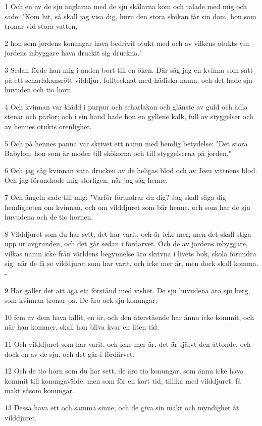 \par 1 Och en av de sju änglarna med de sju skålarna kom och talade med mig och sade: "Kom hit, så skall jag visa dig, huru den stora skökan får sin dom, hon som tronar vid stora vatten,
\par 2 hon som jordens konungar hava bedrivit otukt med och av vilkens otukts vin jordens inbyggare hava druckit sig druckna."
\par 3 Sedan förde han mig i anden bort till en öken. Där såg jag en kvinna som satt på ett scharlakansrött vilddjur, fulltecknat med hädiska namn; och det hade sju huvuden och tio horn.
\par 4 Och kvinnan var klädd i purpur och scharlakan och glänste av guld och ädla stenar och pärlor; och i sin hand hade hon en gyllene kalk, full av styggelser och av hennes otukts orenlighet.
\par 5 Och på hennes panna var skrivet ett namn med hemlig betydelse: "Det stora Babylon, hon som är moder till skökorna och till styggelserna på jorden."
\par 6 Och jag såg kvinnan vara drucken av de heligas blod och av Jesu vittnens blod. Och jag förundrade mig storligen, när jag såg henne.
\par 7 Och ängeln sade till mig: "Varför förundrar du dig? Jag skall säga dig hemligheten om kvinnan, och om vilddjuret som bär henne, och som har de sju huvudena och de tio hornen.
\par 8 Vilddjuret som du har sett, det har varit, och är icke mer; men det skall stiga upp ur avgrunden, och det går sedan i fördärvet. Och de av jordens inbyggare, vilkas namn icke från världens begynnelse äro skrivna i livets bok, skola förundra sig, när de få se vilddjuret som har varit, och icke mer är, men dock skall komma. -
\par 9 Här gäller det att äga ett förstånd med vishet. De sju huvudena äro sju berg, som kvinnan tronar på. De äro ock sju konungar;
\par 10 fem av dem hava fallit, en är, och den återstående har ännu icke kommit, och när han kommer, skall han bliva kvar en liten tid.
\par 11 Och vilddjuret som har varit, och icke mer är, det är självt den åttonde, och dock en av de sju, och det går i fördärvet.
\par 12 Och de tio horn som du har sett, de äro tio konungar, som ännu icke hava kommit till konungavälde, men som för en kort tid, tillika med vilddjuret, få makt såsom konungar.
\par 13 Dessa hava ett och samma sinne, och de giva sin makt och myndighet åt vilddjuret.
